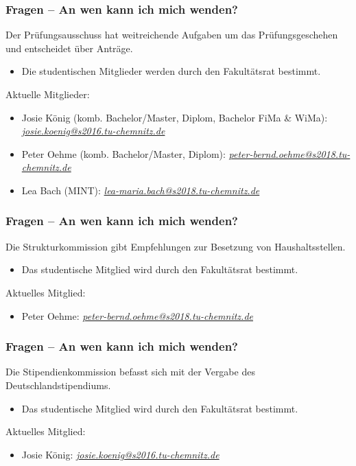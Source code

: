 \documentclass[10pt]{beamer}
\begin{document}
\begin{frame}
\frametitle{Fragen -- An wen kann ich mich wenden?}
\begin{block}{\vphantom{X}}
	Der Prüfungsausschuss hat weitreichende Aufgaben um das Prüfungsgeschehen und entscheidet über Anträge.
\end{block}
\begin{itemize}
	\item Die studentischen Mitglieder werden durch den Fakultätsrat bestimmt.
\end{itemize}
Aktuelle Mitglieder:
\begin{itemize}
	\item Josie König (komb. Bachelor/Master, Diplom, Bachelor FiMa \& WiMa): \textit{\href{mailto:josie.koenig@s2016.tu-chemnitz.de}{josie.koenig@s2016.tu-chemnitz.de}}
	\item Peter Oehme (komb. Bachelor/Master, Diplom): \textit{\href{mailto:peter-bernd.oehme@s2018.tu-chemnitz.de}{peter-bernd.oehme@s2018.tu-chemnitz.de}}
	\item Lea Bach (MINT): \textit{\href{mailto:lea-maria.bach@s2018.tu-chemnitz.de}{lea-maria.bach@s2018.tu-chemnitz.de}}
\end{itemize}
\end{frame}

\begin{frame}
\frametitle{Fragen -- An wen kann ich mich wenden?}
\begin{block}{\vphantom{X}}
	Die Strukturkommission gibt Empfehlungen zur Besetzung von Haushaltsstellen.
\end{block}
\begin{itemize}
	\item Das studentische Mitglied wird durch den Fakultätsrat bestimmt.
\end{itemize}
Aktuelles Mitglied:
\begin{itemize}
	\item Peter Oehme: \textit{\href{mailto:peter-bernd.oehme@s2018.tu-chemnitz.de}{peter-bernd.oehme@s2018.tu-chemnitz.de}}
\end{itemize}
\end{frame}

\begin{frame}
\frametitle{Fragen -- An wen kann ich mich wenden?}
\begin{block}{\vphantom{X}}
	Die Stipendienkommission befasst sich mit der Vergabe des Deutschlandstipendiums.
\end{block}
\begin{itemize}
	\item Das studentische Mitglied wird durch den Fakultätsrat bestimmt.
\end{itemize}
Aktuelles Mitglied:
\begin{itemize}
	\item Josie König: \textit{\href{mailto:josie.koenig@s2016.tu-chemnitz.de}{josie.koenig@s2016.tu-chemnitz.de}}
\end{itemize}
\end{frame}
\end{document}
